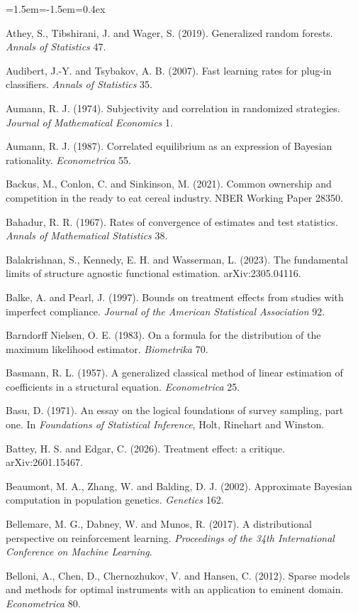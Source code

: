 \begin{list}{}{\leftmargin=1.5em\itemindent=-1.5em\itemsep=0.4ex}
\item Athey, S., Tibshirani, J. and Wager, S. (2019). Generalized random forests. \emph{Annals of Statistics} 47.
\item Audibert, J.-Y. and Tsybakov, A. B. (2007). Fast learning rates for plug-in classifiers. \emph{Annals of Statistics} 35.
\item Aumann, R. J. (1974). Subjectivity and correlation in randomized strategies. \emph{Journal of Mathematical Economics} 1.
\item Aumann, R. J. (1987). Correlated equilibrium as an expression of Bayesian rationality. \emph{Econometrica} 55.
\item Backus, M., Conlon, C. and Sinkinson, M. (2021). Common ownership and competition in the ready to eat cereal industry. NBER Working Paper 28350.
\item Bahadur, R. R. (1967). Rates of convergence of estimates and test statistics. \emph{Annals of Mathematical Statistics} 38.
\item Balakrishnan, S., Kennedy, E. H. and Wasserman, L. (2023). The fundamental limits of structure agnostic functional estimation. arXiv:2305.04116.
\item Balke, A. and Pearl, J. (1997). Bounds on treatment effects from studies with imperfect compliance. \emph{Journal of the American Statistical Association} 92.
\item Barndorff Nielsen, O. E. (1983). On a formula for the distribution of the maximum likelihood estimator. \emph{Biometrika} 70.
\item Basmann, R. L. (1957). A generalized classical method of linear estimation of coefficients in a structural equation. \emph{Econometrica} 25.
\item Basu, D. (1971). An essay on the logical foundations of survey sampling, part one. In \emph{Foundations of Statistical Inference}, Holt, Rinehart and Winston.
\item Battey, H. S. and Edgar, C. (2026). Treatment effect: a critique. arXiv:2601.15467.
\item Beaumont, M. A., Zhang, W. and Balding, D. J. (2002). Approximate Bayesian computation in population genetics. \emph{Genetics} 162.
\item Bellemare, M. G., Dabney, W. and Munos, R. (2017). A distributional perspective on reinforcement learning. \emph{Proceedings of the 34th International Conference on Machine Learning}.
\item Belloni, A., Chen, D., Chernozhukov, V. and Hansen, C. (2012). Sparse models and methods for optimal instruments with an application to eminent domain. \emph{Econometrica} 80.

\end{list}
